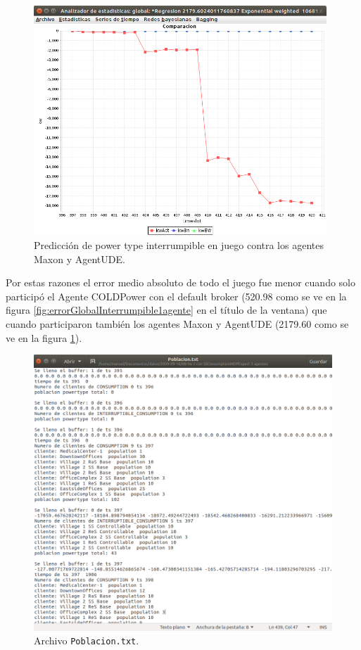 \begin{figure}[ht]
	\centering
	\includegraphics[width=11cm]{img/errorGlobalInterrumpible3agentes.png}
	\caption{Predicción de power type interrumpible en juego contra los agentes Maxon y AgentUDE.}
	\label{fig:errorGlobalInterrumpible3agentes}
\end{figure}

Por estas razones el error medio absoluto de todo el juego fue menor cuando solo participó el Agente COLDPower con el default broker (520.98 como se ve en la figura \ref{fig:errorGlobalInterrumpible1agente} en el título de la ventana) que cuando participaron también los agentes Maxon y AgentUDE (2179.60 como se ve en la figura \ref{fig:errorGlobalInterrumpible3agentes}).

\begin{figure}[ht]
	\centering
	\includegraphics[width=11.25cm]{img/poblaciontxt.png}
	\caption{Archivo \texttt{Poblacion.txt}.}
	\label{fig:poblaciontxt}
\end{figure}

